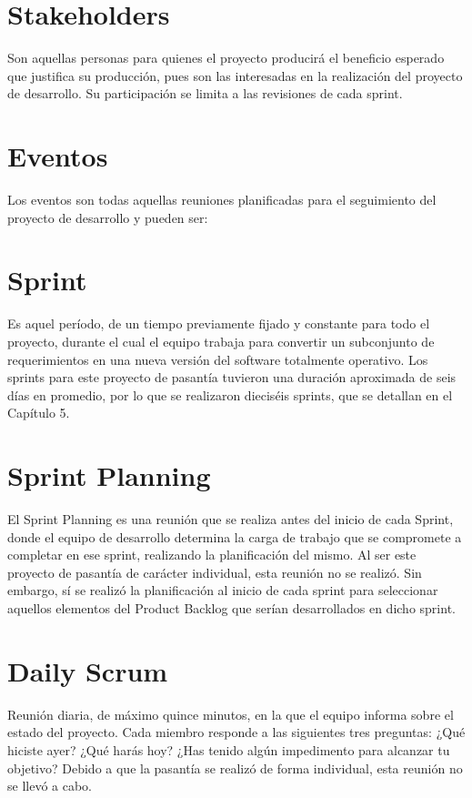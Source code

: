 \section{Stakeholders}
Son aquellas personas para quienes el proyecto producirá el beneficio esperado que justifica su producción, pues son las interesadas en la realización del proyecto de desarrollo. Su participación se limita a las revisiones de cada sprint.

\section{Eventos}
Los eventos son todas aquellas reuniones planificadas para el seguimiento del proyecto de desarrollo y pueden ser:

\section{Sprint}
Es aquel período, de un tiempo previamente fijado y constante para todo el proyecto, durante el cual el equipo trabaja para convertir un subconjunto de requerimientos en una nueva versión del software totalmente operativo. Los sprints para este proyecto de pasantía tuvieron una duración aproximada de seis días en promedio, por lo que se realizaron dieciséis sprints, que se detallan en el Capítulo 5.

\section{Sprint Planning}
El Sprint Planning es una reunión que se realiza antes del inicio de cada Sprint, donde el equipo de desarrollo determina la carga de trabajo que se compromete a completar en ese sprint, realizando la planificación del mismo. Al ser este proyecto de pasantía de carácter individual, esta reunión no se realizó. Sin embargo, sí se realizó la planificación al inicio de cada sprint para seleccionar aquellos elementos del Product Backlog que serían desarrollados en dicho sprint.

\section{Daily Scrum}
Reunión diaria, de máximo quince minutos, en la que el equipo informa sobre el estado del proyecto. Cada miembro responde a las siguientes tres preguntas:
¿Qué hiciste ayer?
¿Qué harás hoy?
¿Has tenido algún impedimento para alcanzar tu objetivo?
Debido a que la pasantía se realizó de forma individual, esta reunión no se llevó a cabo.

